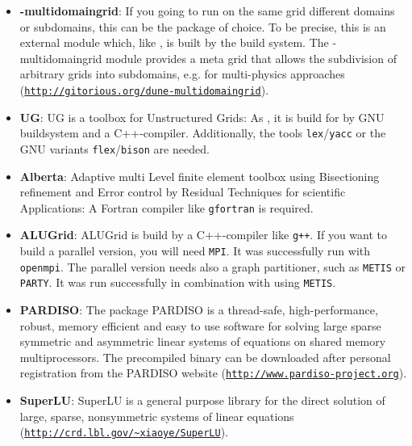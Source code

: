\begin{itemize}
\item \textbf{\Dune-multidomaingrid}: If you going to run on the same grid different domains or subdomains,
this can be the package of choice. 
To be precise, this is an external \Dune module which, like \Dumux, is built by the \Dune build system. The \Dune-multidomaingrid module provides a meta grid that allows the subdivision of arbitrary \Dune grids into subdomains, e.g. for multi-physics approaches (\texttt{\url{http://gitorious.org/dune-multidomaingrid}}).

\item \textbf{UG}: UG is a toolbox for Unstructured Grids: As \Dumux, it is build for \Dune by GNU buildsystem and a C++-compiler. Additionally, the tools \texttt{lex}/\texttt{yacc} or the GNU variants \texttt{flex}/\texttt{bison} are needed. 

\item \textbf{Alberta}: Adaptive multi Level finite element toolbox using Bisectioning refinement and Error control by Residual Techniques for scientific Applications: A Fortran compiler like \texttt{gfortran} is required.

\item \textbf{ALUGrid}: ALUGrid is build by a C++-compiler like \texttt{g++}. If you want to build a parallel version, you will need \texttt{MPI}. It was successfully run with \texttt{openmpi}. The parallel version needs also a graph partitioner, such as \texttt{METIS} or \texttt{PARTY}. It was run successfully in combination with \Dune using \texttt{METIS}.

\item \textbf{PARDISO}: The package PARDISO is a thread-safe, high-performance, robust, memory efficient and easy to use software for solving large sparse symmetric and asymmetric linear systems of equations on shared memory multiprocessors. The precompiled binary can be downloaded after personal registration from the PARDISO website (\texttt{\url{http://www.pardiso-project.org}}).

\item \textbf{SuperLU}: SuperLU is a general purpose library for the direct solution of large, sparse, nonsymmetric systems of linear equations (\texttt{\url{http://crd.lbl.gov/~xiaoye/SuperLU}}).

\end{itemize}


